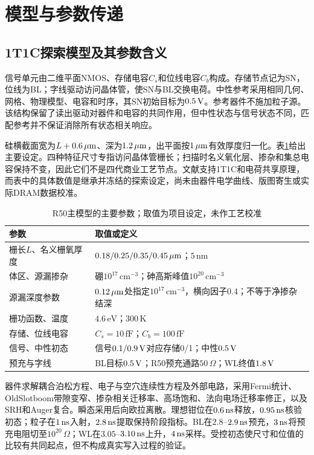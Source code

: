 \section{模型与参数传递}
\subsection{1T1C探索模型及其参数含义}
信号单元由二维平面NMOS、存储电容$C_s$和位线电容$C_b$构成。存储节点记为SN，位线为BL；字线驱动访问晶体管，使SN与BL交换电荷。中性参考采用相同几何、网格、物理模型、电容和时序，其SN初始目标为$0.5\,\mathrm{V}$。参考器件不施加粒子源。该结构保留了读出驱动对器件和电容的共同作用，但中性状态与信号状态不同，匹配参考并不保证消除所有状态相关响应。

硅横截面宽为$L+0.6\,\mu\mathrm{m}$、深为$1.2\,\mu\mathrm{m}$，出平面按$1\,\mu\mathrm{m}$有效厚度归一化。表\ref{tab:paper-parameters}给出主要设定。四种特征尺寸专指访问晶体管栅长；扫描时名义氧化层、掺杂和集总电容保持不变，因此它们不是四代商业工艺节点。文献支持1T1C和电荷共享原理，而表中的具体数值是继承并冻结的探索设定，尚未由器件电学曲线、版图寄生或实际DRAM数据校准。

\begin{table}[htbp]
\centering\small
\caption{R50主模型的主要参数；取值为项目设定，未作工艺校准}
\label{tab:paper-parameters}
\begin{tabularx}{\textwidth}{@{}p{3.2cm}X@{}}
\toprule
参数 & 取值或定义\\
\midrule
栅长$L$、名义栅氧厚度 & $0.18/0.25/0.35/0.45\,\mu\mathrm{m}$；$5\,\mathrm{nm}$\\
体区、源漏掺杂 & 硼$10^{17}\,\mathrm{cm}^{-3}$；砷高斯峰值$10^{20}\,\mathrm{cm}^{-3}$\\
源漏深度参数 & $0.12\,\mu\mathrm{m}$处指定$10^{17}\,\mathrm{cm}^{-3}$，横向因子0.4；不等于净掺杂结深\\
栅功函数、温度 & $4.6\,\mathrm{eV}$；$300\,\mathrm{K}$\\
存储、位线电容 & $C_s=10\,\mathrm{fF}$；$C_b=100\,\mathrm{fF}$\\
信号、中性初态 & 信号$0.1/0.9\,\mathrm{V}$对应存储0/1；中性$0.5\,\mathrm{V}$\\
预充与字线 & BL目标$0.5\,\mathrm{V}$；R50预充通路$50\,\Omega$；WL终值$1.8\,\mathrm{V}$\\
\bottomrule
\end{tabularx}
\end{table}

器件求解耦合泊松方程、电子与空穴连续性方程及外部电路，采用Fermi统计、OldSlotboom带隙变窄、掺杂相关迁移率、高场饱和、法向电场迁移率修正，以及SRH和Auger复合。瞬态采用后向欧拉离散。理想钳位在$0.6\,\mathrm{ns}$释放，$0.95\,\mathrm{ns}$核验初态；粒子在$1\,\mathrm{ns}$入射，$2.8\,\mathrm{ns}$提取保持阶段指标。BL在$2.8$--$2.9\,\mathrm{ns}$预充，$3\,\mathrm{ns}$将预充电阻切至$10^{20}\,\Omega$；WL在$3.05$--$3.10\,\mathrm{ns}$上升，$4\,\mathrm{ns}$采样。受控初态使尺寸和位值的比较有共同起点，但不构成真实写入过程的验证。

